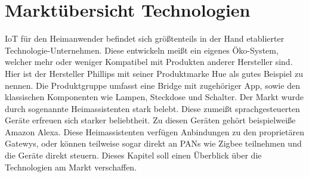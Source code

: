 \chapter{Marktübersicht Technologien}

IoT für den Heimanwender befindet sich größtenteils in der Hand etablierter Technologie-Unternehmen. Diese entwickeln meißt ein eigenes Öko-System,
welcher mehr oder weniger Kompatibel mit Produkten anderer Hersteller sind. Hier ist der Hersteller Phillips mit seiner Produktmarke \grqq Hue \grqq{}
als gutes Beispiel zu nennen. Die Produktgruppe umfasst eine Bridge mit zugehöriger App, sowie den klassischen Komponenten wie Lampen, Steckdose und Schalter.
Der Markt wurde durch sogenannte Heimassistenten stark belebt. Diese zumeißt sprachgesteuerten Geräte erfreuen sich starker beliebtheit. Zu diesen Geräten
gehört beispielweiße Amazon Alexa. Diese Heimassistenten verfügen Anbindungen zu den proprietären Gatewys, oder können teilweise sogar direkt an PANs wie Zigbee
teilnehmen und die Geräte direkt steuern. Dieses Kapitel soll einen Überblick über die Technologien am Markt verschaffen. 


